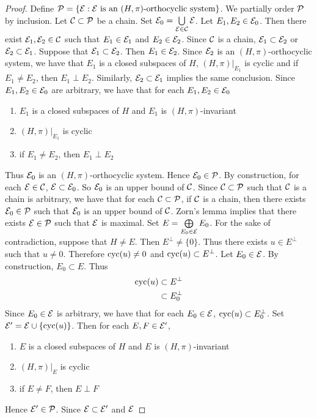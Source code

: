 \documentclass{book}
\begin{document}
	\begin{proof}
		Define $\mathcal{P} = \{\mathcal{E}: \text{$\mathcal{E}$ is an $(H, \pi)$-orthocyclic system}\}$. We partially order $\mathcal{P}$ by inclusion. Let $\mathcal{C} \subset \mathcal{P}$ be a chain. Set $\mathcal{E}_0 = \bigcup\limits_{\mathcal{E} \in \mathcal{C}} \mathcal{E}$. Let $E_1, E_2 \in \mathcal{E}_0$. Then there exist $\mathcal{E}_1, \mathcal{E}_2 \in \mathcal{C}$ such that $E_1 \in \mathcal{E}_1$ and $E_2 \in \mathcal{E}_2$. Since $\mathcal{C}$ is a chain, $\mathcal{E}_1 \subset \mathcal{E}_2$ or $\mathcal{E}_2 \subset \mathcal{E}_1$. Suppose that $\mathcal{E}_1 \subset \mathcal{E}_2$. Then $E_1 \in \mathcal{E}_2$. Since $\mathcal{E}_2$ is an $(H, \pi)$-orthocyclic system, we have that $E_1$ is a closed subspaces of $H$, $(H, \pi)|_{E_1}$ is cyclic and if $E_1 \neq E_2$, then $E_1 \perp E_2$. Similarly, $\mathcal{E}_2 \subset \mathcal{E}_1$ implies the same conclusion. Since $E_1, E_2 \in \mathcal{E}_0$ are arbitrary, we have that for each $E_1, E_2 \in \mathcal{E}_0$ 
		\begin{enumerate}
			\item $E_1$ is a closed subspaces of $H$ and $E_1$ is $(H, \pi)$-invariant
			\item $(H, \pi)|_{E_1}$ is cyclic
			\item if $E_1 \neq E_2$, then $E_1 \perp E_2$
		\end{enumerate}
		Thus $\mathcal{E}_0$ is an $(H, \pi)$-orthocyclic system. Hence $\mathcal{E}_0 \in \mathcal{P}$. By construction, for each $\mathcal{E} \in \mathcal{C}$, $\mathcal{E} \subset \mathcal{E}_0$. So $\mathcal{E}_0$ is an upper bound of $\mathcal{C}$. Since $\mathcal{C} \subset \mathcal{P}$ such that $\mathcal{C}$ is a chain is arbitrary, we have that for each $\mathcal{C} \subset \mathcal{P}$, if $\mathcal{C}$ is a chain, then there exists $\mathcal{E}_0 \in \mathcal{P}$ such that $\mathcal{E}_0$ is an upper bound of $\mathcal{C}$. Zorn's lemma implies that there exists $\mathcal{E} \in \mathcal{P}$ such that $\mathcal{E}$ is maximal. Set $E =  \bigoplus\limits_{E_0 \in \mathcal{E}} E_0$. For the sake of contradiction, suppose that $H \neq E$. Then $E^{\perp} \neq \{0\}$. Thus there exists $u \in E^{\perp}$ such that $u \neq 0$. Therefore $\operatorname{cyc}(u) \neq 0$ and $\operatorname{cyc}(u) \subset E^{\perp}$. Let $E_0 \in \mathcal{E}$. By construction, $E_0 \subset E$. Thus
		\begin{align*}
			\operatorname{cyc}(u) 
			& \subset E^{\perp} \\
			& \subset E_0^{\perp}
		\end{align*}
		Since $E_0 \in \mathcal{E}$ is arbitrary, we have that for each $E_0 \in \mathcal{E}$, $\operatorname{cyc}(u) \subset E_0^{\perp}$. Set $\mathcal{E}' = \mathcal{E} \cup \{\operatorname{cyc}(u)\}$. Then for each $E,F \in \mathcal{E}'$, 
		\begin{enumerate}
			\item $E$ is a closed subspaces of $H$ and $E$ is $(H, \pi)$-invariant
			\item $(H, \pi)|_{E}$ is cyclic
			\item if $E \neq F$, then $E \perp F$
		\end{enumerate}
		Hence $\mathcal{E}' \in \mathcal{P}$. Since $\mathcal{E} \subset \mathcal{E}'$ and $\mathcal{E}$
	\end{proof}
	
\end{document}
